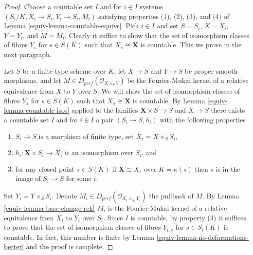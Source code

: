 \begin{proof}

Choose a countable set $I$ and for $i \in I$ systems
$(S_i/K, X_i \to S_i, Y_i \to S_i, M_i)$ satisfying properties
(1), (2), (3), and (4) of Lemma \ref{equiv-lemma-countable-equivs}.
Pick $i \in I$ and set $S = S_i$, $X = X_i$, $Y = Y_i$, and
$M = M_i$. Clearly it suffice to show that
the set of isomorphism classes of fibres $Y_s$ for $s \in S(K)$
such that $X_s \cong \mathbf{X}$ is countable.
This we prove in the next paragraph.

\medskip\noindent
Let $S$ be a finite type scheme over $K$, let $X \to S$ and $Y \to S$
be proper smooth morphisms, and let $M \in D_{perf}(\mathcal{O}_{X \times_S Y})$
be the Fourier-Mukai kernel of a relative equivalence from $X$
to $Y$ over $S$. We will show
the set of isomorphism classes of fibres $Y_s$ for $s \in S(K)$
such that $X_s \cong \mathbf{X}$ is countable.
By Lemma \ref{equiv-lemma-countable-isos} applied
to the families $\mathbf{X} \times S \to S$ and $X \to S$
there exists a countable set $I$ and for $i \in I$ a pair
$(S_i \to S, h_i)$ with the following properties
\begin{enumerate}
\item $S_i \to S$ is a morphism of finite type, set
$X_i = X \times_S S_i$,
\item $h_i : \mathbf{X} \times S_i \to X_i$
is an isomorphism over $S_i$, and
\item for any closed point $s \in S(K)$ if $\mathbf{X} \cong X_s$
over $K = \kappa(s)$ then $s$ is in the image of $S_i \to S$
for some $i$.
\end{enumerate}
Set $Y_i = Y \times_S S_i$. Denote
$M_i \in D_{perf}(\mathcal{O}_{X_i \times_{S_i} Y_i})$
the pullback of $M$. By Lemma \ref{equiv-lemma-base-change-rek}
$M_i$ is the Fourier-Mukai kernel of a relative equivalence from
$X_i$ to $Y_i$ over $S_i$. Since $I$ is countable, by
property (3) it suffices to prove that
the set of isomorphism classes of fibres $Y_{i, s}$ for $s \in S_i(K)$
is countable.
In fact, this number is finite by
Lemma \ref{equiv-lemma-no-deformations-better}
and the proof is complete.
\end{proof}




